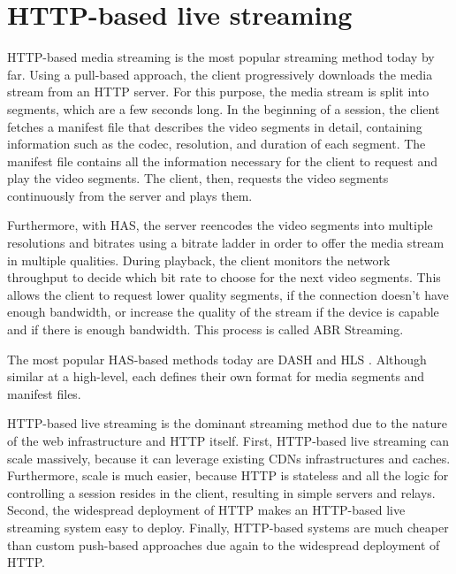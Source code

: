 \section{HTTP-based live streaming}
HTTP-based media streaming is the most popular streaming method today by far. Using a pull-based approach, the client progressively downloads the media stream from an HTTP server. For this purpose, the media stream is split into segments, which are a few seconds long. In the beginning of a session, the client fetches a manifest file that describes the video segments in detail, containing information such as the codec, resolution, and duration of each segment. The manifest file contains all the information necessary for the client to request and play the video segments. The client, then, requests the video segments continuously from the server and plays them.

Furthermore, with \acf{HAS}, the server reencodes the video segments into multiple resolutions and bitrates using a bitrate ladder in order to offer the media stream in multiple qualities. During playback, the client monitors the network throughput to decide which bit rate to choose for the next video segments. This allows the client to request lower quality segments, if the connection doesn't have enough bandwidth, or increase the quality of the stream if the device is capable and if there is enough bandwidth. This process is called \ac{ABR} Streaming.

The most popular HAS-based methods today are \ac{DASH} \parencite{14:00-17:00ISOIEC230091} and \ac{HLS} \parencite{incHTTPLiveStreaming}. Although similar at a high-level, each defines their own format for media segments and manifest files.

HTTP-based live streaming is the dominant streaming method due to the nature of the web infrastructure and HTTP itself. First, HTTP-based live streaming can scale massively, because it can leverage existing CDNs infrastructures and caches. Furthermore, scale is much easier, because HTTP is stateless and all the logic for controlling a session resides in the client, resulting in simple servers and relays. Second, the widespread deployment of HTTP makes an HTTP-based live streaming system easy to deploy. Finally, HTTP-based systems are much cheaper than custom push-based approaches due again to the widespread deployment of HTTP.

